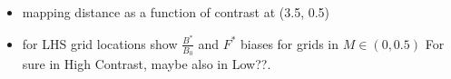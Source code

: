 %
 

\begin{itemize}
\item mapping distance as a function of contrast at (3.5, 0.5)

\item for LHS grid locations show $\frac{B^*}{B_0}$ and $F^*$ biases for grids in $M\in(0,0.5)$ For sure in High Contrast, maybe also in Low??.
\end{itemize}




